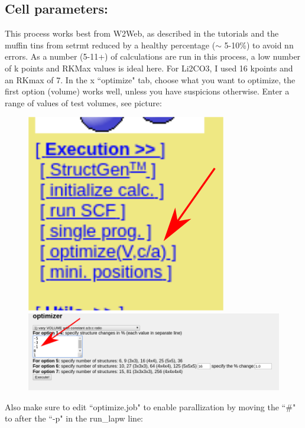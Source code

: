 \documentclass[12pt]{article}
\begin{document}
\subsection{Cell parameters:}
This process works best from W2Web, as described in the tutorials and the muffin tins from setrmt reduced by a healthy percentage ($\sim$ 5-10\%) to avoid nn errors.   As  a number (5-11+) of calculations are run in this process, a low number of k points and RKMax values is ideal here. For Li2CO3, I used 16 kpoints and an RKmax of 7.   In the x ``optimize" tab, choose what you want to optimize, the first option (volume) works well, unless you have suspicions otherwise.  Enter a range of values of test volumes, see picture:

\begin{figure}[H]

\includegraphics[scale=0.3]{./images/vol_opt_menu.png}
~
\includegraphics[scale=0.3]{./images/vol_opt.png}



\end{figure}


Also make sure to edit ``optimize.job" to enable parallization by moving the ``\#" to after the ``-p" in the run\_lapw line: 
\end{document}
